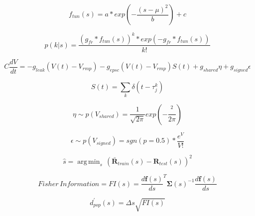 \documentclass{article}
\DeclareMathOperator*{\argmin}{arg\,min}
\begin{document}
\begin{equation}
f_{tun}(s) = a * exp{\left( -\frac{(s-\mu)^{2}}{b} \right)} + c
\end{equation}

\begin{equation}
p(k | s) = \frac{(g_{fr}*f_{tun}(s))^{k} * exp{\left(-g_{fr}*f_{tun}(s)\right)}}{k!}
\end{equation}

\begin{equation}
C\frac{dV}{dt} = - g_{leak}(V(t) - V_{rmp}) - g_{epsc}(V(t) - V_{rmp})S(t) + g_{shared}\eta + g_{signed}\epsilon
\end{equation}

\begin{equation}
S(t) = \sum_{k} \delta(t-\tau_{j}^{k})
\end{equation}

\begin{equation}
\eta \sim p(V_{shared}) = \frac{1}{\sqrt{2\pi}} exp{\left(-\frac{^{2}}{2\pi} \right)}
\end{equation}

\begin{equation}
\epsilon \sim p(V_{signed}) = sgn(p=0.5) * \frac{e^{V}}{V!}
\end{equation}

\begin{equation}
\hat{s} = \argmin_{s} \, (\mathbf{\bar{R}}_{train}(s) - \mathbf{R}_{test}(s))^{2}
\end{equation}

\begin{equation}
Fisher \, Information = FI(s) = \frac{d\mathbf{f}(s)}{ds}^{T} \mathbf{\Sigma}(s)^{-1} \frac{d\mathbf{f}(s)}{ds}
\end{equation}

\begin{equation}
d^{'}_{pop}(s) = \Delta s \sqrt{FI(s)}
\end{equation}

	
\end{document}

